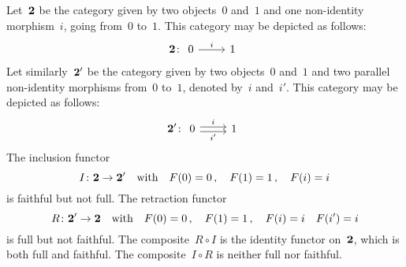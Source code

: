\subsubsection{}

Let~$\mathbf{2}$ be the category given by two objects~$0$ and~$1$ and one non-identity morphism~$i$, going from~$0$ to~$1$.
This category may be depicted as follows:
\[
	\Two
	\colon
	\begin{tikzcd}
		0
		\arrow{r}[above]{i}
		&
		1
	\end{tikzcd}
\]
Let similarly~$\mathbf{2}'$ be the category given by two objects~$0$ and~$1$ and two parallel non-identity morphisms from~$0$ to~$1$, denoted by~$i$ and~$i'$.
This category may be depicted as follows:
\[
	\Two'
	\colon
	\begin{tikzcd}
		0
		\arrow[yshift= 0.5ex]{r}[above]{i}
		\arrow[yshift=-0.5ex]{r}[below]{i'}
		&
		1
	\end{tikzcd}
\]
The inclusion functor
\[
	I
	\colon
	\mathbf{2} \to \mathbf{2}'
	\quad\text{with}\quad
	F(0) = 0 \,,
	\quad
	F(1) = 1 \,,
	\quad
	F(i) = i
\]
is faithful but not full.
The retraction functor
\[
	R
	\colon
	\mathbf{2}' \to \mathbf{2}
	\quad\text{with}\quad
	F(0)  = 0 \,,
	\quad
	F(1)  = 1 \,,
	\quad
	F(i)  = i
	\quad
	F(i') = i
\]
is full but not faithful.
The composite~$R ∘ I$ is the identity functor on~$\mathbf{2}$, which is both full and faithful.
The composite~$I ∘ R$ is neither full nor faithful.

